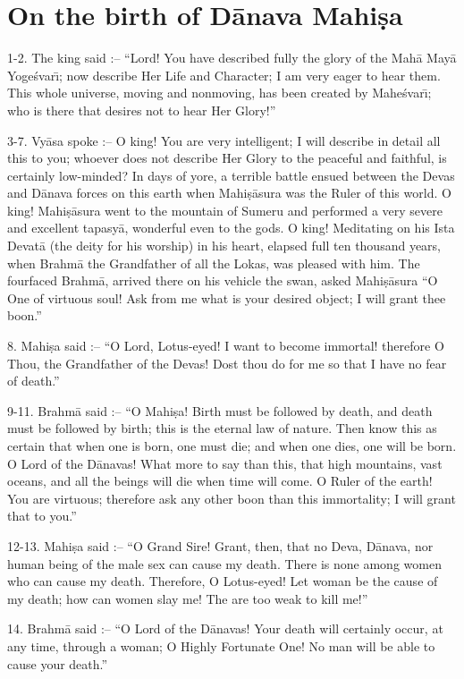 \chapter{On the birth of D\=anava Mahi\d{s}a}

1-2. The king said :-- ``Lord! You have described fully the glory of the Mah\=a May\=a Yoge\'svar\={\i}; now describe Her Life and Character; I am very eager to hear them. This whole universe, moving and nonmoving, has been created by Mahe\'svar\={\i}; who is there that desires not to hear Her Glory!''

3-7. Vy\=asa spoke :-- O king! You are very intelligent; I will describe in detail all this to you; whoever does not describe Her Glory to the peaceful and faithful, is certainly low-minded? In days of yore, a terrible battle ensued between the Devas and D\=anava forces on this earth when Mahi\d{s}\=asura was the Ruler of this world. O king! Mahi\d{s}\=asura went to the mountain of Sumeru and performed a very severe and excellent tapasy\=a, wonderful even to the gods. O king! Meditating on his Ista Devat\=a (the deity for his worship) in his heart, elapsed full ten thousand years, when Brahm\=a the Grandfather of all the Lokas, was pleased with him. The fourfaced Brahm\=a, arrived there on his vehicle the swan, asked Mahi\d{s}\=asura ``O One of virtuous soul! Ask from me what is your desired object; I will grant thee boon.''

8. Mahi\d{s}a said :-- ``O Lord, Lotus-eyed! I want to become immortal! therefore O Thou, the Grandfather of the Devas! Dost thou do for me so that I have no fear of death.''

9-11. Brahm\=a said :-- ``O Mahi\d{s}a! Birth must be followed by death, and death must be followed by birth; this is the eternal law of nature. Then know this as certain that when one is born, one must die; and when one dies, one will be born. O Lord of the D\=anavas! What more to say than this, that high mountains, vast oceans, and all the beings will die when time will come. O Ruler of the earth! You are virtuous; therefore ask any other boon than this immortality; I will grant that to you.''

12-13. Mahi\d{s}a said :-- ``O Grand Sire! Grant, then, that no Deva, D\=anava, nor human being of the male sex can cause my death. There is none among women who can cause my death. Therefore, O Lotus-eyed! Let woman be the cause of my death; how can women slay me! The are too weak to kill me!''

14. Brahm\=a said :-- ``O Lord of the D\=anavas! Your death will certainly occur, at any time, through a woman; O Highly Fortunate One! No man will be able to cause your death.''

